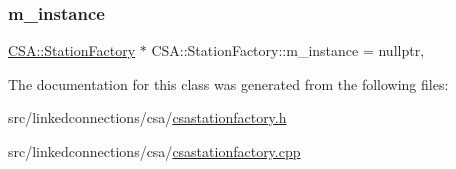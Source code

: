 \mbox{\label{classCSA_1_1StationFactory_a23e50080f272055c906807d809334b1b}} 
\subsubsection{\texorpdfstring{m\+\_\+instance}{m\_instance}}
{\footnotesize\ttfamily \mbox{\hyperlink{classCSA_1_1StationFactory}{C\+S\+A\+::\+Station\+Factory}} $\ast$ C\+S\+A\+::\+Station\+Factory\+::m\+\_\+instance = nullptr\hspace{0.3cm}{\ttfamily [static]}, {\ttfamily [private]}}



The documentation for this class was generated from the following files\+:\begin{DoxyCompactItemize}
\item 
src/linkedconnections/csa/\mbox{\hyperlink{csastationfactory_8h}{csastationfactory.\+h}}\item 
src/linkedconnections/csa/\mbox{\hyperlink{csastationfactory_8cpp}{csastationfactory.\+cpp}}\end{DoxyCompactItemize}
